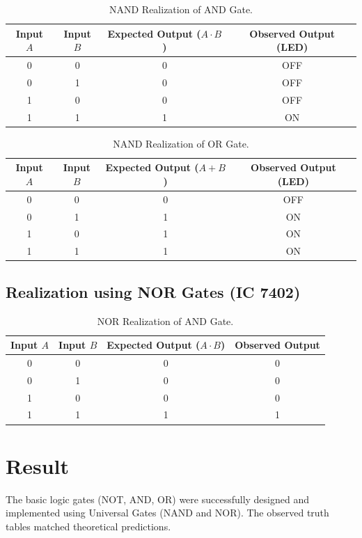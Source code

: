 \begin{table}[htbp]
\centering
\small
\begin{tabularx}{0.8\textwidth}{c c c c}
\toprule
\textbf{Input $A$} & \textbf{Input $B$} & \textbf{Expected Output ($A \cdot B$)} & \textbf{Observed Output (LED)} \\
\midrule
0 & 0 & 0 & OFF \\
0 & 1 & 0 & OFF \\
1 & 0 & 0 & OFF \\
1 & 1 & 1 & ON \\
\bottomrule
\end{tabularx}
\caption{NAND Realization of AND Gate.}
\label{tab:nand-and}
\end{table}

\begin{table}[htbp]
\centering
\small
\begin{tabularx}{0.8\textwidth}{c c c c}
\toprule
\textbf{Input $A$} & \textbf{Input $B$} & \textbf{Expected Output ($A + B$)} & \textbf{Observed Output (LED)} \\
\midrule
0 & 0 & 0 & OFF \\
0 & 1 & 1 & ON \\
1 & 0 & 1 & ON \\
1 & 1 & 1 & ON \\
\bottomrule
\end{tabularx}
\caption{NAND Realization of OR Gate.}
\label{tab:nand-or}
\end{table}

\subsection{Realization using NOR Gates (IC 7402)}

\begin{table}[htbp]
\centering
\small
\begin{tabularx}{0.8\textwidth}{c c c c}
\toprule
\textbf{Input $A$} & \textbf{Input $B$} & \textbf{Expected Output ($A \cdot B$)} & \textbf{Observed Output} \\
\midrule
0 & 0 & 0 & 0 \\
0 & 1 & 0 & 0 \\
1 & 0 & 0 & 0 \\
1 & 1 & 1 & 1 \\
\bottomrule
\end{tabularx}
\caption{NOR Realization of AND Gate.}
\label{tab:nor-and}
\end{table}

\section{Result}
The basic logic gates (NOT, AND, OR) were successfully designed and implemented using Universal Gates (NAND and NOR). The observed truth tables matched theoretical predictions.

